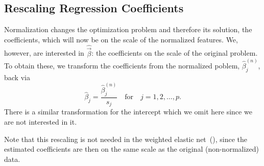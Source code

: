 \subsection{Rescaling Regression Coefficients}

Normalization changes the optimization problem and therefore its solution, the
coefficients, which will now be on the scale of the normalized features. We, however, are
interested in \(\hat{\vec{\beta}}\): the coefficients on the scale of the original problem.
To obtain these, we transform the coefficients from the normalized poblem,
\(\hat\beta^{(n)}_j\), back via
%
\begin{equation}
  \label{eq:orthogonal-solution}
  \hat\beta_j = \frac{\hat\beta^{(n)}_j}{s_j} \quad\text{for}\quad j = 1,2,\dots,p.
\end{equation}
%
There is a similar transformation for the intercept which we omit here since we are not
interested in it.

Note that this rescaling is not needed in the weighted elastic
net~(), since the estimated coefficients are then on the same
scale as the original (non-normalized) data.
